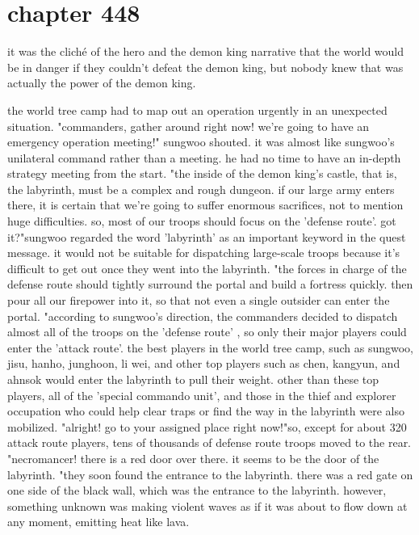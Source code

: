 \section{chapter 448}

it was the cliché of the hero and the demon king narrative that the world would be in danger if they couldn't defeat the demon king, but nobody knew that was actually the power of the demon king.





the world tree camp had to map out an operation urgently in an unexpected situation.
"commanders, gather around right now! we're going to have an emergency operation meeting!" sungwoo shouted.
 it was almost like sungwoo's unilateral command rather than a meeting.
he had no time to have an in-depth strategy meeting from the start.
 "the inside of the demon king's castle, that is, the labyrinth, must be a complex and rough dungeon.
 if our large army enters there, it is certain that we're going to suffer enormous sacrifices, not to mention huge difficulties.
 so, most of our troops should focus on the 'defense route'.
 got it?"sungwoo regarded the word 'labyrinth' as an important keyword in the quest message.
it would not be suitable for dispatching large-scale troops because it's difficult to get out once they went into the labyrinth.
"the forces in charge of the defense route should tightly surround the portal and build a fortress quickly.
 then pour all our firepower into it, so that not even a single outsider can enter the portal.
"according to sungwoo's direction, the commanders decided to dispatch almost all of the troops on the 'defense route' , so only their major players could enter the 'attack route'.
the best players in the world tree camp, such as sungwoo, jisu, hanho, junghoon, li wei, and other top players such as chen, kangyun, and ahnsok would enter the labyrinth to pull their weight.
 other than these top players, all of the 'special commando unit', and those in the thief and explorer occupation who could help clear traps or find the way in the labyrinth were also mobilized.
"alright! go to your assigned place right now!"so, except for about 320 attack route players, tens of thousands of defense route troops moved to the rear.
"necromancer! there is a red door over there.
 it seems to be the door of the labyrinth.
"they soon found the entrance to the labyrinth.
there was a red gate on one side of the black wall, which was the entrance to the labyrinth.
however, something unknown was making violent waves as if it was about to flow down at any moment, emitting heat like lava.

